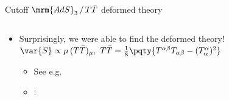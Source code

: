 \documentclass[aspectratio=169,10pt
	,noamsthm
]{beamer}
\begin{document}
\begin{frame}{Cutoff $\mrm{AdS}_3\,/\,T\bar{T}$ deformed theory}{%
	\textcite{McGough:2016lol}%
}
\begin{columns}
\begin{column}{.65\textwidth}
\begin{itemize}
		\item Surprisingly, we were able to find the deformed theory!\\
		$
			\var{S} \propto \mu\,(T\bar{T})_\mu,\ %
			T\bar{T}
			= \frac{1}{8} \pqty{
					T^{\alpha\beta} T_{\alpha\beta}
					- (T^\alpha_\alpha)^2
				}
		$
		
			\begin{itemize}
			
			\item See e.g.~\textcite{Smirnov:2016lqw}
			
			\item \textcite{McGough:2016lol}:\\
			
			\end{itemize}
		
		\end{itemize}
	\end{column}
	\end{columns}
\end{frame}
\end{document}
